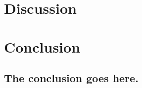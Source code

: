 \documentclass[conference]{IEEEtran}
\begin{document}



\section{Discussion}

 


\section{Conclusion}
\subsection{The conclusion goes here.}




\appendix
\end{document}
